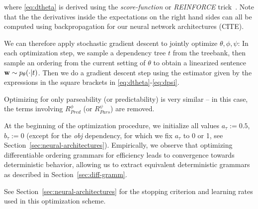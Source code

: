 \documentclass[10pt,twoside,lineno]{article}
\DeclareMathOperator{\E}{\mathop{\mathbb{E}}}
\begin{document}
where \ref{eq:dtheta} is derived using the \emph{score-function} or \emph{REINFORCE} trick~\cite{williams1992simple}.
Note that the the derivatives inside the expectations on the right hand sides can all be computed using backpropagation for our neural network architectures (CITE).

We can therefore apply stochastic gradient descent to jointly optimize $\theta, \phi, \psi$:
In each optimization step, we sample a dependency tree $t$ from the treebank, then sample an ordering from the current setting of $\theta$ to obtain a linearized sentence ${\bf w} \sim p_{\theta}(\cdot|t)$.
Then we %
do a gradient descent step using the estimator given by the expressions in the square brackets in \ref{eq:dtheta}-\ref{eq:dpsi}.


Optimizing for only parseability (or predictability) is very similar -- in this case, the terms involving $R_{Pred}^\phi$ (or $R_{Pars}^\psi$) are removed.


At the beginning of the optimization procedure, we initialize all values $a_\tau := 0.5$, $b_\tau := 0$ (except for the \emph{obj} dependency, for which we fix $a_\tau$ to 0 or 1, see Section~\ref{sec:neural-architectures}).
Empirically, we observe that optimizing differentiable ordering grammars for efficiency leads to convergence towards deterministic behavior, allowing us to extract equivalent deterministic grammars as described in Section~\ref{sec:diff-gramm}.

See Section~\ref{sec:neural-architectures} for the stopping criterion and learning rates used in this optimization scheme.



%
%
\end{document}
